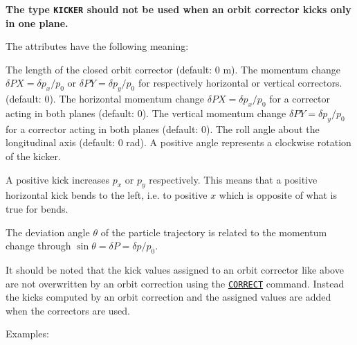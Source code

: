 
{\bf The type {\tt KICKER} should not be used when an orbit corrector
  kicks only in one plane.}

The attributes have the following meaning: 
\begin{madlist}
    The length of the closed orbit corrector (default: 0 m). 
    The momentum change $\delta PX = \delta p_x/p_0$ or 
     $\delta PY = \delta p_y / p_0$ for respectively horizontal or vertical
     correctors. (default: 0).  
    The horizontal momentum change 
     $\delta PX = \delta p_x/p_0$ for a corrector acting in both planes
     (default: 0).  
    The vertical momentum change 
     $\delta PY = \delta p_y/p_0$  for a corrector acting in both planes
     (default: 0).  
    The roll angle about the longitudinal axis (default: 0
     rad). A positive angle represents a clockwise rotation of the
     kicker.  
\end{madlist}

A positive kick increases $p_x$ or $p_y$ respectively. This
means that a positive horizontal kick bends to the left,  i.e. to
positive $x$ which is opposite of what is true for bends.    

The deviation angle $\theta$ of the particle trajectory is related to
the momentum change through  $\sin \theta = \delta P = \delta p / p_0$.

It should be noted that the kick values assigned to an orbit corrector
like above are not overwritten by an orbit correction using the 
\hyperref[sec:correct]{\tt CORRECT}
command. Instead the kicks computed by an orbit correction and the
assigned values are added when the correctors are used.  

 Examples: 

